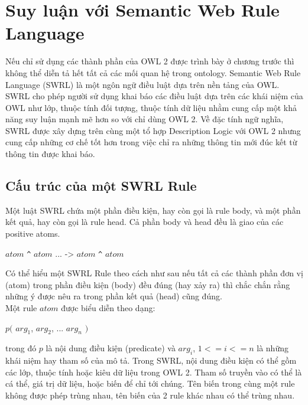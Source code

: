 \chapter{Suy luận với Semantic Web Rule Language}
Nếu chỉ sử dụng các thành phần của  OWL 2 được trình bày ở chương trước thì không thể diễn tả hết tất cả các mối quan hệ trong ontology. Semantic Web Rule Language (SWRL) là một ngôn ngữ điều luật dựa trên nền tảng của OWL. SWRL cho phép người sử dụng khai báo các điều luật dựa trên các khái niệm của OWL như lớp, thuộc tính đối tượng, thuộc tính dữ liệu nhằm cung cấp một khả năng suy luận mạnh mẽ hơn so với chỉ dùng OWL 2. Về đặc tính ngữ nghĩa, SWRL được xây dựng trên cùng một tổ hợp Description Logic với OWL 2 nhưng cung cấp những cơ chế tốt hơn trong việc chỉ ra những thông tin mới đúc kết từ thông tin được khai báo.
\section{Cấu trúc của một SWRL Rule}
Một luật SWRL chứa một phần điều kiện, hay còn gọi là rule body, và một phần kết quả, hay còn gọi là rule head. Cả phần body và head đều là giao của các positive atoms.
\begin{center}
$atom$ \verb|^| $atom$ ... -> $atom$ \verb|^| $atom$ 
\end{center}
Có thể hiểu một SWRL Rule theo cách như sau nếu tất cả các thành phần đơn vị (atom) trong phần điều kiện (body) đều đúng (hay xảy ra) thì chắc chắn rằng những ý được nêu ra trong phần kết quả (head) cũng đúng.
\\
Một rule $atom$ được biểu diễn theo dạng:

\begin{center}
$p($ $arg_{1}$, $arg_{2}$, ... $arg_{n}$ $)$
\end{center}

trong đó $p$ là nội dung điều kiện (predicate) và $arg_{i}$, $1<=i<=n$ là những khái niệm hay tham số của mô tả. Trong SWRL, nội dung điều kiện có thể gồm các lớp, thuộc tính hoặc kiêu dữ liệu trong OWL 2. Tham số truyền vào có thể là cá thể, giá trị dữ liệu, hoặc biến để chỉ tới chúng. Tên biến trong cùng một rule không được phép trùng nhau, tên biến của 2 rule khác nhau có thể trùng nhau.